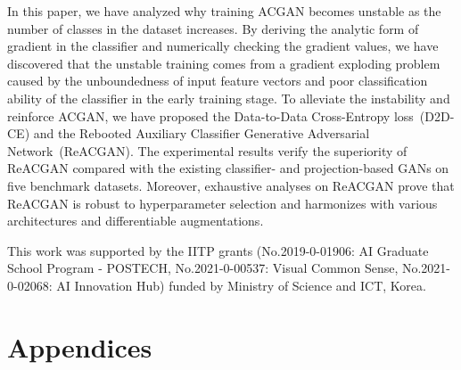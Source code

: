\documentclass{article}
\begin{document}
\label{sec:Conclusion}
In this paper, we have analyzed why training ACGAN becomes unstable as the number of classes in the dataset increases. By deriving the analytic form of gradient in the classifier and numerically checking the gradient values, we have discovered that the unstable training comes from a gradient exploding problem caused by the unboundedness of input feature vectors and poor classification ability of the classifier in the early training stage. To alleviate the instability and reinforce ACGAN, we have proposed the Data-to-Data Cross-Entropy loss~(D2D-CE) and the Rebooted Auxiliary Classifier Generative Adversarial Network~(ReACGAN). The experimental results verify the superiority of ReACGAN compared with the existing classifier- and projection-based GANs on five benchmark datasets. Moreover, exhaustive analyses on ReACGAN prove that ReACGAN is robust to hyperparameter selection and harmonizes with various architectures and differentiable augmentations. \newpage
\begin{ack}
This work was supported by the IITP
grants (No.2019-0-01906: AI Graduate School Program - POSTECH, No.2021-0-00537: Visual Common Sense, No.2021-0-02068: AI Innovation Hub) funded by Ministry of Science and ICT, Korea.

\end{ack} {\small
    
    
}
\clearpage
\appendix
\section*{\Large{Appendices}}
\renewcommand\thefigure{A\arabic{figure}}
\renewcommand{\thetable}{A\arabic{table}}
\setcounter{figure}{0}
\setcounter{table}{0}
\setcounter{property}{0}
\end{document}
